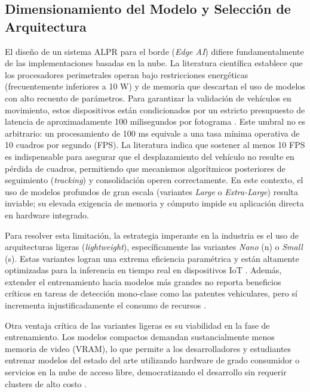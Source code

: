 \subsection{Dimensionamiento del Modelo y Selección de Arquitectura}

El diseño de un sistema ALPR para el borde (\textit{Edge AI}) difiere fundamentalmente de las implementaciones basadas en la nube. La literatura científica establece que los procesadores perimetrales operan bajo restricciones energéticas (frecuentemente inferiores a 10 W) y de memoria que descartan el uso de modelos con alto recuento de parámetros. Para garantizar la validación de vehículos en movimiento, estos dispositivos están condicionados por un estricto presupuesto de latencia de aproximadamente 100 milisegundos por fotograma \parencite{sonnaraEfficientRealtimeLicense2025}. Este umbral no es arbitrario: un procesamiento de 100 ms equivale a una tasa mínima operativa de 10 cuadros por segundo (FPS). La literatura indica que sostener al menos 10 FPS es indispensable para asegurar que el desplazamiento del vehículo no resulte en pérdida de cuadros, permitiendo que mecanismos algorítmicos posteriores de seguimiento (\textit{tracking}) y consolidación operen correctamente. En este contexto, el uso de modelos profundos de gran escala (variantes \textit{Large} o \textit{Extra-Large}) resulta inviable; su elevada exigencia de memoria y cómputo impide su aplicación directa en hardware integrado.

Para resolver esta limitación, la estrategia imperante en la industria es el uso de arquitecturas ligeras (\textit{lightweight}), específicamente las variantes \textit{Nano} (n) o \textit{Small} (s). Estas variantes logran una extrema eficiencia paramétrica y están altamente optimizadas para la inferencia en tiempo real en dispositivos IoT \parencite{mobeenRealTimeAutomaticLicense2026}. Además, extender el entrenamiento hacia modelos más grandes no reporta beneficios críticos en tareas de detección mono-clase como las patentes vehiculares, pero sí incrementa injustificadamente el consumo de recursos \parencite{buleuDeepLearningBasedSystem2025a}.

Otra ventaja crítica de las variantes ligeras es su viabilidad en la fase de entrenamiento. Los modelos compactos demandan sustancialmente menos memoria de video (VRAM), lo que permite a los desarrolladores y estudiantes entrenar modelos del estado del arte utilizando hardware de grado consumidor o servicios en la nube de acceso libre, democratizando el desarrollo sin requerir clusters de alto costo \parencite{YOLOv10VsYOLOv82025}.

